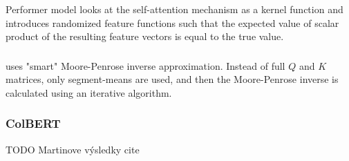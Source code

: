 Performer model \citep{performer} looks at the self-attention mechanism as a kernel function and introduces randomized feature functions such that the expected value of scalar product %
of the resulting feature vectors is equal to the true value.

\subsubsection{\nystr}

\nystr \citep{nystrom} uses "smart" Moore-Penrose inverse approximation. Instead of full $Q$ and $K$ matrices, only segment-means are used, and then the Moore-Penrose inverse is calculated using an iterative algorithm.

\subsubsection{ColBERT}
TODO Martinove výsledky cite



